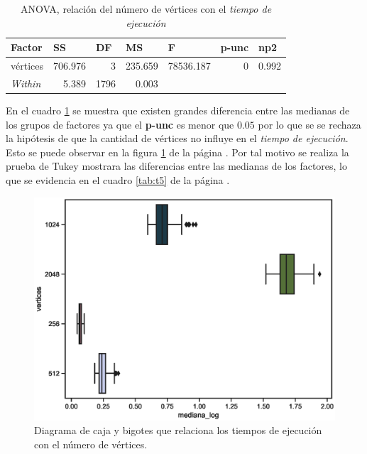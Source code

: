 \documentclass{article}
\begin{document}
\begin{table}[htbp]
  \centering
  \caption{ANOVA, relación del número de vértices con el \textit{tiempo de ejecución}}
    \begin{tabular}{lrrrlll}
    \toprule
    \textbf{Factor} & \multicolumn{1}{l}{\textbf{SS}} & \multicolumn{1}{l}{\textbf{DF}} & \multicolumn{1}{l}{\textbf{MS}} & \textbf{F} & \textbf{p-unc} & \textbf{np2} \\
    \midrule
    vértices & 706.976 & 3     & 235.659 & \multicolumn{1}{r}{78536.187} & \multicolumn{1}{r}{0} & \multicolumn{1}{r}{0.992} \\
    \textit{Within} & 5.389 & 1796  & 0.003 &    &     & \\
    \bottomrule
    \end{tabular}%
  \label{tab:t4}%
\end{table}%
En el cuadro \ref{tab:t4} se muestra que existen grandes diferencia entre las medianas de los grupos de factores ya que el \textbf{p-unc} es menor que $0.05$ por lo que se se rechaza la hipótesis de que la cantidad de vértices no influye en el \textit{tiempo de ejecución}. Esto se puede observar en la figura \ref{fig6} de la página \pageref{fig6}. Por tal motivo se realiza la prueba de Tukey mostrara las diferencias entre las medianas de los factores, lo que se evidencia en el cuadro \ref{tab:t5} de la página \pageref{tab:t5}.   
\begin{center}
\begin{figure}[htbp]
\includegraphics[scale=0.6]{boxplotvertices.eps}
\caption{Diagrama de caja y bigotes que relaciona los tiempos de ejecución con el número de vértices.}
\label{fig6}
\end{figure}
\end{center}
\end{document}

